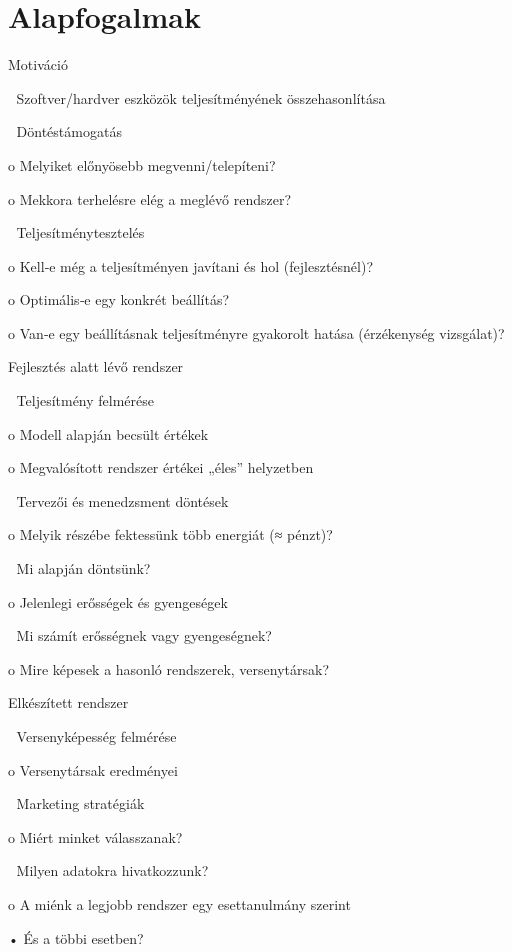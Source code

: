 \label{cha:benchmarking}

\graphicspath{ {./benchmarking/figures/} }


\section{Alapfogalmak}

Motiváció

 Szoftver/hardver eszközök teljesítményének összehasonlítása

 Döntéstámogatás 

o Melyiket előnyösebb megvenni/telepíteni?

o Mekkora terhelésre elég a meglévő rendszer?

 Teljesítménytesztelés 

o Kell‐e még a teljesítményen javítani és hol 
(fejlesztésnél)?

o Optimális‐e egy konkrét beállítás?

o Van‐e egy beállításnak teljesítményre gyakorolt hatása 
(érzékenység vizsgálat)?

Fejlesztés alatt lévő rendszer

 Teljesítmény felmérése

o Modell alapján becsült értékek

o Megvalósított rendszer értékei „éles” helyzetben

 Tervezői és menedzsment döntések

o Melyik részébe fektessünk több energiát (≈ pénzt)? 

 Mi alapján döntsünk?

o Jelenlegi erősségek és gyengeségek

 Mi számít erősségnek vagy gyengeségnek?

o Mire képesek a hasonló rendszerek, versenytársak?

Elkészített rendszer

 Versenyképesség felmérése

o Versenytársak eredményei

 Marketing stratégiák

o Miért minket válasszanak?

 Milyen adatokra hivatkozzunk?

o A miénk a legjobb rendszer egy esettanulmány szerint

• És a többi esetben?

